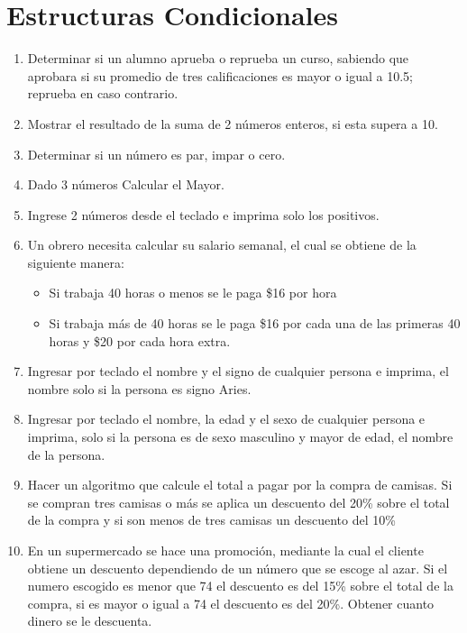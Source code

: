 \documentclass{scrartcl}
\begin{document}
	\section{Estructuras Condicionales}
		
	\begin{enumerate}
		
		\item Determinar si un alumno aprueba o reprueba un curso, sabiendo que aprobara si su promedio de tres calificaciones es mayor o igual a 10.5; reprueba en caso contrario.
		
		\item Mostrar el resultado de la suma de 2 números enteros, si esta supera a 10.
		
		\item Determinar si un número es par, impar o cero.
		
		\item Dado 3 números Calcular el Mayor.
		
		\item Ingrese 2 números desde el teclado e imprima solo los positivos.
		
		\item Un obrero necesita calcular su salario semanal, el cual se obtiene de la
		siguiente manera:
		
			\begin{itemize}
				\item Si trabaja 40 horas o menos se le paga \$16 por hora
				\item Si trabaja más de 40 horas se le paga \$16 por cada una de las primeras 40 horas
				y \$20 por cada hora extra.		
			\end{itemize}
		
		
		\item Ingresar por teclado el nombre y el signo de cualquier persona e imprima, el
		nombre solo si la persona es signo Aries.
		
		\item Ingresar por teclado el nombre, la edad y el sexo de cualquier persona e	imprima, solo si la persona es de sexo masculino y mayor de edad, el nombre de la persona.
		
		\item Hacer un algoritmo que calcule el total a pagar por la compra de camisas. Si se compran tres camisas o más se aplica un descuento del 20\% sobre el total de la compra y si son menos de tres camisas un descuento del 10\%
		
		\item En un supermercado se hace una promoción, mediante la cual el cliente		obtiene un descuento dependiendo de un número que se escoge al azar. Si el		numero escogido es menor que 74 el descuento es del 15\% sobre el total de la compra, si es mayor o igual a 74 el descuento es del 20\%. Obtener cuanto		dinero se le descuenta.
		

\end{enumerate}
\end{document}
